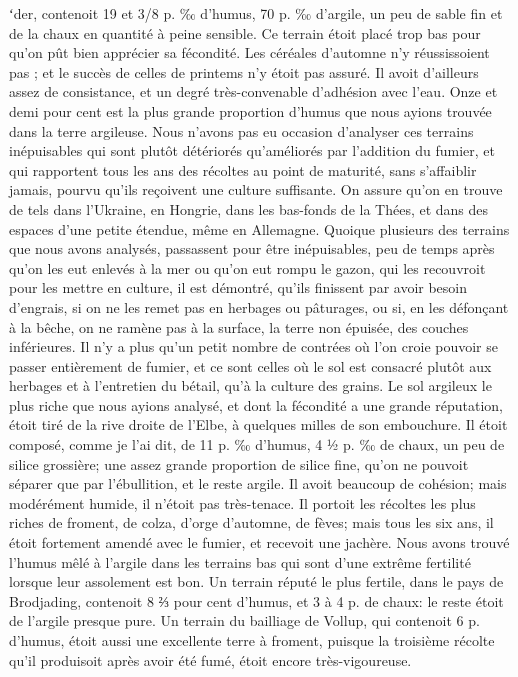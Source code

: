 ʻder, contenoit 19 et 3/8 p. ‰ d’humus, 70 p. ‰ d’argile, un peu de sable fin et de la chaux en quantité à peine sensible. Ce terrain étoit placé trop bas pour qu’on pût bien apprécier sa fécondité. Les céréales d’automne n’y réussissoient pas ; et le succès de celles de printems n’y étoit pas assuré. Il avoit d’ailleurs assez de consistance, et un degré très-convenable d’adhésion avec l’eau. Onze et demi pour cent est la plus grande proportion d’humus que nous ayions trouvée dans la terre argileuse. Nous n’avons pas eu occasion d’analyser ces terrains inépuisables qui sont plutôt détériorés qu’améliorés par l’addition du fumier, et qui rapportent tous les ans des récoltes au point de maturité, sans s’affaiblir jamais, pourvu qu’ils reçoivent une culture suffisante. On assure qu’on en trouve de tels dans l’Ukraine, en Hongrie, dans les bas-fonds de la Thées, et dans des espaces d’une petite étendue, même en Allemagne. Quoique plusieurs des terrains que nous avons analysés, passassent pour être inépuisables, peu de temps après qu’on les eut enlevés à la mer ou qu’on eut rompu le gazon, qui les recouvroit pour les mettre en culture, il est démontré, qu’ils finissent par avoir besoin d’engrais, si on ne les remet pas en herbages ou pâturages, ou si,\setcounter{page}{102} en les défonçant à la bêche, on ne ramène pas à la surface, la terre non épuisée, des couches inférieures. Il n'y a plus qu'un petit nombre de contrées où l'on croie pouvoir se passer entièrement de fumier, et ce sont celles où le sol est consacré plutôt aux herbages et à l'entretien du bétail, qu'à la culture des grains.
Le sol argileux le plus riche que nous ayions analysé, et dont la fécondité a une grande réputation, étoit tiré de la rive droite de l'Elbe, à quelques milles de son embouchure. Il étoit composé, comme je l'ai dit, de 11 p. ‰ d'humus, 4 ½ p. ‰ de chaux, un peu de silice grossière; une assez grande proportion de silice fine, qu'on ne pouvoit séparer que par l'ébullition, et le reste argile. Il avoit beaucoup de cohésion; mais modérément humide, il n'étoit pas très-tenace. Il portoit les récoltes les plus riches de froment, de colza, d'orge d'automne, de fèves; mais tous les six ans, il étoit fortement amendé avec le fumier, et recevoit une jachère.
Nous avons trouvé l'humus mêlé à l'argile dans les terrains bas qui sont d'une extrême fertilité lorsque leur assolement est bon. Un terrain réputé le plus fertile, dans le pays de Brodjading, contenoit 8 ⅔ pour\setcounter{page}{103} cent d'humus, et 3 à 4 p.  de chaux: le reste étoit de l'argile presque pure. Un terrain du bailliage de Vollup, qui contenoit 6  p.  d'humus, étoit aussi une excellente terre à froment, puisque la troisième récolte qu'il produisoit après avoir été fumé, étoit encore très-vigoureuse.

